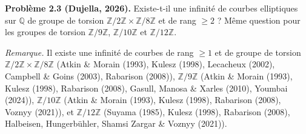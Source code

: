 \textbf{Problème 2.3 (Dujella, 2026).} Existe-t-il une infinité de courbes elliptiques sur $\mathbb{Q}$ de groupe de torsion $\mathbb{Z}/2\mathbb{Z}\times\mathbb{Z}/8\mathbb{Z}$ et de rang $\geqslant 2$ ? Même question pour les groupes de torsion $\mathbb{Z}/9\mathbb{Z}$, $\mathbb{Z}/10\mathbb{Z}$ et $\mathbb{Z}/12\mathbb{Z}$.

\medskip

\textit{Remarque.} Il existe une infinité de courbes de rang $\geqslant 1$ et de groupe de torsion $\mathbb{Z}/2\mathbb{Z}\times\mathbb{Z}/8\mathbb{Z}$ (Atkin \& Morain (1993), Kulesz (1998), Lecacheux (2002), Campbell \& Goins (2003), Rabarison (2008)), $\mathbb{Z}/9\mathbb{Z}$ (Atkin \& Morain (1993), Kulesz (1998), Rabarison (2008), Gasull, Manosa \& Xarles (2010), Youmbai (2024)), $\mathbb{Z}/10\mathbb{Z}$ (Atkin \& Morain (1993), Kulesz (1998), Rabarison (2008), Voznyy (2021)), et $\mathbb{Z}/12\mathbb{Z}$ (Suyama (1985), Kulesz (1998), Rabarison (2008), Halbeisen, Hungerbühler, Shamsi Zargar \& Voznyy (2021)).
